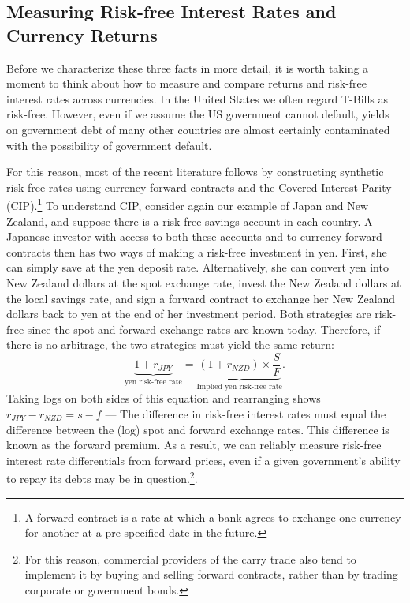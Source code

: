 \begin{textbox}[h]\section{Measuring Risk-free Interest Rates and Currency Returns}

Before we characterize these three facts in more detail, it is worth
taking a moment to think about how to measure and compare returns and risk-free
interest rates across currencies. In the United States we often regard
T-Bills as risk-free. However, even if we assume the US government
cannot default, yields on government debt of many other countries are
almost certainly contaminated with the possibility of government
default.

For this reason, most of the recent literature follows \cite{LustigRoussanovVerdelhan2011} by
constructing synthetic risk-free rates using currency forward
contracts and the Covered Interest Parity (CIP).\footnote{A forward
  contract is a rate at which a bank agrees to exchange one currency
  for another at a pre-specified date in the future.} To understand
CIP, consider again our example of Japan and New Zealand, and suppose
there is a risk-free savings account in each country. A Japanese
investor with access to both these accounts and to currency forward
contracts then has two ways of making a risk-free investment in yen.
First, she can simply save at the yen deposit rate. Alternatively, she
can convert yen into New Zealand dollars at the spot exchange rate,
invest the New Zealand dollars at the local savings rate, and sign a
forward contract to exchange her New Zealand dollars back to yen at the
end of her investment period. Both strategies are risk-free since the
spot and forward exchange rates are known today. Therefore, if there
is no arbitrage, the two strategies must yield the same return:
\begin{equation}
  \underbrace{1 + r_{JPY}}_{\text{yen risk-free rate}}
  = \underbrace{
    (1 + r_{NZD}) \times \frac{S}{F}
  }_{\text{Implied yen risk-free rate}}.
\end{equation}
Taking logs on both sides of this equation and rearranging shows
$r_{JPY}-r_{NZD}=s-f$ --- The difference in risk-free interest
rates must equal the difference between the (log) spot and forward
exchange rates. This difference is known as the forward premium. As a
result, we can reliably measure risk-free interest rate differentials
from forward prices, even if a given government's ability to repay its
debts may be in question.\footnote{For this reason, commercial providers of the
carry trade also tend to implement it by buying and selling forward
contracts, rather than by trading corporate or government bonds.}.\end{textbox}


